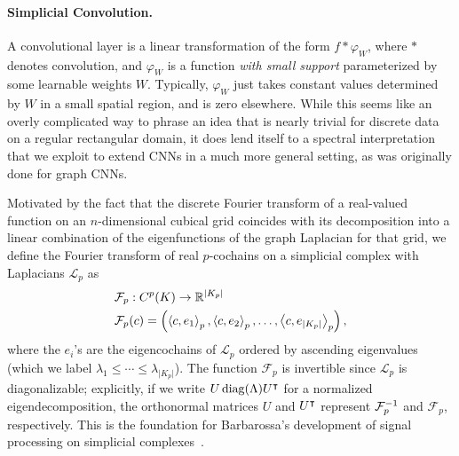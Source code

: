 \paragraph{Simplicial Convolution.}
 
A convolutional layer is a linear transformation of the form $f\ast \varphi_W$, where $\ast$ denotes convolution, and $\varphi_W$ is a function
\emph{with small support} 
parameterized by some learnable weights $W$.
Typically, $\varphi_W$ just takes constant values determined by $W$ in a small spatial region, and is zero elsewhere.
While this seems like an overly complicated way to phrase an idea that is nearly trivial for discrete data on a regular rectangular domain, it does lend itself to a spectral interpretation that we exploit to extend CNNs in a much more general setting, as was originally done for graph CNNs.

Motivated by the fact that the discrete Fourier transform of a real-valued function on an $n$-dimensional cubical grid coincides with its decomposition into a linear combination of the eigenfunctions of the graph Laplacian for that grid, we define the Fourier transform of real $p$-cochains on a simplicial complex with Laplacians $\mathcal{L}_p$ as
\begin{align*}
  &\mathcal{F}_p: C^p(K) \to \mathbb{R}^{\lvert K_p \rvert} \\
  &\mathcal{F}_p(c) = \left(\left\langle c , e_1 \right\rangle_p, \left\langle c , e_2 \right\rangle_p, \dotsc, \left\langle c , e_{\lvert K_p \rvert} \right\rangle_p\right),
\end{align*}
where the $e_i$'s are the eigencochains of $\mathcal{L}_p$ ordered by ascending eigenvalues (which we label $\lambda_1\leq\dotsm\leq\lambda_{\lvert K_p \rvert}$). The function $\mathcal{F}_p$ is invertible since $\mathcal{L}_p$ is diagonalizable; explicitly, if we write $U\operatorname{diag}(\Lambda)U^{\intercal}$ for a normalized eigendecomposition, the orthonormal matrices $U$ and $U^{\intercal}$ represent $\mathcal{F}^{-1}_p$ and $\mathcal{F}_p$, respectively. This is the foundation for Barbarossa's development of signal processing on simplicial complexes~\cite{barbarossa2018learning}.

